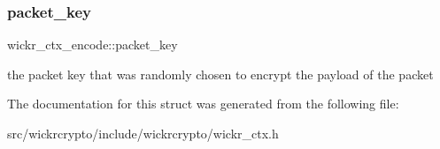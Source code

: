 \subsubsection{\texorpdfstring{packet\+\_\+key}{packet\_key}}
{\footnotesize\ttfamily wickr\+\_\+ctx\+\_\+encode\+::packet\+\_\+key}

the packet key that was randomly chosen to encrypt the payload of the packet 

The documentation for this struct was generated from the following file\+:\begin{DoxyCompactItemize}
\item 
src/wickrcrypto/include/wickrcrypto/wickr\+\_\+ctx.\+h\end{DoxyCompactItemize}

